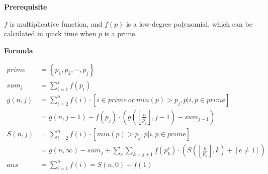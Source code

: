 \noindent\textbf{Prerequisite}

$f$ is multiplicative function, and $f(p)$ is a low-degree polynomial, which can be calculated in quick time when $p$ is a prime.  

\noindent\textbf{Formula}

\begin{equation*}
\begin{aligned}
prime   &= \left\{p_1, p_2, \cdots, p_j\right\} \\
sum_{j} &= \sum_{i=1}^{j} f(p_i) \\
g(n, j) &= \sum_{i=2}^{n} f(i) \cdot [i \in prime \ or \ min(p) > p_j, p|i, p \in prime] \\
&= g(n, j - 1) - f(p_j) \cdot \left(g\left(\left\lfloor\frac{n}{p_j}\right\rfloor, j-1\right) - sum_{j-1}\right) \\
S(n, j) &= \sum_{i=2}^{n} f(i) \cdot [min(p) > p_j, p|i, p \in prime] \\
&= g(n, \infty) - sum_j + \sum_{e} \sum_{k=j+1} f(p_k^e) \cdot \left( S\left(\left\lfloor \frac{n}{p_k^e}\right\rfloor, k \right) + \left[e \neq 1\right] \right) \\
ans &= \sum_{i=1}^{n}f(i) = S(n, 0) + f(1)\\
\end{aligned}
\end{equation*}

